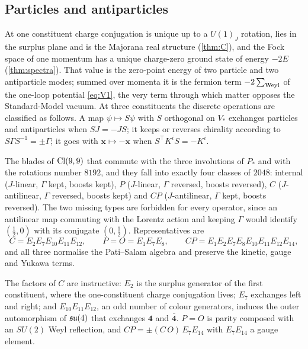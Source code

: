 \subsection{Particles and antiparticles}

At one constituent charge conjugation is unique up to a $U(1)_J$ rotation, lies in the surplus plane and is the Majorana real structure (\cref{thm:C}), and the
Fock space of one momentum has a unique charge-zero ground state of energy $-2E$ (\cref{thm:spectra}). That value is the zero-point energy of two particle and two
antiparticle modes; summed over momenta it is the fermion term $-2\sum_{\rm Weyl}$ of the one-loop potential \eqref{eq:V1}, the very term through which matter
opposes the Standard-Model vacuum. At three constituents the discrete operations are classified as follows. A map $\psi\mapsto S\psi$ with $S$ orthogonal on $V_*$
exchanges particles and antiparticles when $SJ=-JS$; it keeps or reverses chirality according to $S\Gamma S^{-1}=\pm\Gamma$; it goes with $\mathbf x\mapsto-\mathbf x$ when
$S^{\!\top}K^iS=-K^i$.

\begin{theorem}
\label{thm:fourclasses}
The blades of $\mathrm{Cl}(9,9)$ that commute with the three involutions of $P_*$ and with the rotations number $8192$, and they fall into exactly four classes of $2048$:
internal ($J$-linear, $\Gamma$ kept, boosts kept), $P$ ($J$-linear, $\Gamma$ reversed, boosts reversed), $C$ ($J$-antilinear, $\Gamma$ reversed, boosts kept) and $CP$
($J$-antilinear, $\Gamma$ kept, boosts reversed). The two missing types are forbidden for every operator, since an antilinear map commuting with the Lorentz action and
keeping $\Gamma$ would identify $(\tfrac12,0)$ with its conjugate $(0,\tfrac12)$. Representatives are
\[
C=E_2E_7E_{10}E_{11}E_{12},\qquad P=O=E_1E_7E_8,\qquad CP=E_1E_2E_7E_8E_{10}E_{11}E_{12}E_{14},
\]
and all three normalise the Pati--Salam algebra and preserve the kinetic, gauge and Yukawa terms.
\end{theorem}

The factors of $C$ are instructive: $E_2$ is the surplus generator of the first constituent, where the one-constituent charge conjugation lives; $E_7$
exchanges left and right; and $E_{10}E_{11}E_{12}$, an odd number of colour generators, induces the outer automorphism of $\mathfrak{su}(4)$ that exchanges $\mathbf4$ and
$\bar{\mathbf4}$. $P=O$ is parity composed with an $SU(2)$ Weyl reflection, and $CP=\pm(C\,O)\,E_7E_{14}$ with $E_7E_{14}$ a gauge element.

